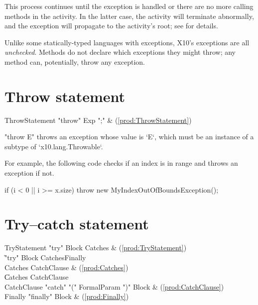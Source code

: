 This process continues until the exception is handled or there are no more
calling methods in the activity. In the latter case, the activity will
terminate abnormally, and the exception will propagate to the activity's root;
see  for details.

Unlike some statically-typed languages with exceptions, X10's exceptions are
all {\em unchecked}. Methods do not declare which exceptions they might throw;
any method can, potentially, throw any exception.


\section{Throw statement}

\begin{bbgrammar}
      ThrowStatement \: \xcd"throw" Exp \xcd";" & (\ref{prod:ThrowStatement}) \\
\end{bbgrammar}

\xcd"throw E" throws an exception whose value is \xcd`E`, which must be an
instance of a subtype of \xcd`x10.lang.Throwable`. 

For example, the following code checks if an index is in range and
throws an exception if not.

\begin{xten}
if (i < 0 || i >= x.size)
    throw new MyIndexOutOfBoundsException();
\end{xten}

\section{Try--catch statement}

\begin{bbgrammar}
        TryStatement \: \xcd"try" Block Catches & (\ref{prod:TryStatement}) \\
                    \| \xcd"try" Block Catches\opt Finally \\
             Catches \: CatchClause & (\ref{prod:Catches}) \\
                    \| Catches CatchClause \\
         CatchClause \: \xcd"catch" \xcd"(" FormalParam \xcd")" Block & (\ref{prod:CatchClause}) \\
             Finally \: \xcd"finally" Block & (\ref{prod:Finally}) \\
\end{bbgrammar}

